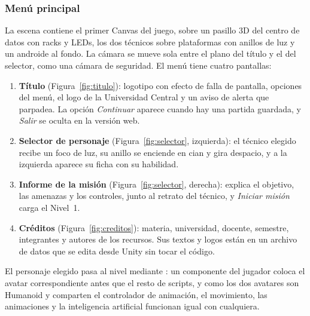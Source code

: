 \subsubsection{Menú principal}

La escena  contiene el primer Canvas del juego, sobre un pasillo 3D del centro de
datos con racks y LEDs, los dos técnicos sobre plataformas con anillos de luz y un androide al fondo.
La cámara se mueve sola entre el plano del título y el del selector, como una cámara de seguridad.
El menú tiene cuatro pantallas:

\begin{enumerate}
  \item \textbf{Título} (Figura~\ref{fig:titulo}): logotipo con efecto de falla de pantalla,
        opciones del menú, el logo de la Universidad Central y un aviso de alerta que parpadea. La
        opción \textit{Continuar} aparece cuando hay una partida guardada, y \textit{Salir} se oculta
        en la versión web.
  \item \textbf{Selector de personaje} (Figura~\ref{fig:selector}, izquierda): el técnico elegido recibe un foco
        de luz, su anillo se enciende en cian y gira despacio, y a la izquierda aparece su ficha con
        su habilidad.
  \item \textbf{Informe de la misión} (Figura~\ref{fig:selector}, derecha): explica el objetivo, las amenazas
        y los controles, junto al retrato del técnico, y \textit{Iniciar misión} carga el Nivel~1.
  \item \textbf{Créditos} (Figura~\ref{fig:creditos}): materia, universidad, docente, semestre,
        integrantes y autores de los recursos. Sus textos y logos están en un archivo de datos que
        se edita desde Unity sin tocar el código.
\end{enumerate}




El personaje elegido pasa al nivel mediante : un componente del jugador coloca
el avatar correspondiente antes que el resto de scripts, y como los dos avatares son Humanoid y
comparten el controlador de animación, el movimiento, las animaciones y la inteligencia artificial
funcionan igual con cualquiera.

